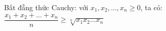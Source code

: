 \documentclass[12pt,a4paper]{article}
\begin{document}
	Bất đẵng thức Cauchy: với $x_1,x_2,\ldots,x_n\geq 0$, ta có: $\dfrac{x_1+x_2+\ldots+x_n}{n}\geq\sqrt[n]{x_1 x_2\ldots x_n}$
\end{document}
